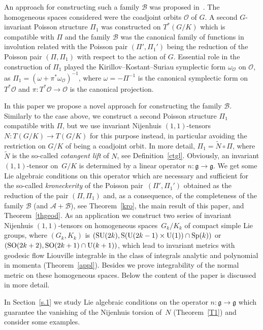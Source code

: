 \documentclass[pdftex]{sigma}
\numberwithin{equation}{section}
\begin{document}
An approach for constructing such a family $\mathcal{B}$ was proposed in~\cite{p4}. The homogeneous spaces considered were the coadjoint orbits $\mathcal{O}$ of $G$. A second $G$-invariant Poisson structure $\Pi_1$ was constructed on $T^*(G/K)$ which is compatible with $\Pi$ and the family $\mathcal{B}$ was the canonical family of functions in involution related with the Poisson pair $(\Pi',\Pi_1')$ being the reduction of the Poisson pair $(\Pi,\Pi_1)$ with respect to the action of $G$. Essential role in the construction of $\Pi_1$ played the Kirillov--Kostant--Suriau symplectic form $\omega_\mathcal{O}$ on $\mathcal{O}$, as $\Pi_1=(\omega+\pi^*\omega_\mathcal{O})^{-1}$, where $\omega=-\Pi^{-1}$ is the canonical symplectic form on $T^*\mathcal{O}$ and $\pi\colon T^*\mathcal{O}\to \mathcal{O}$ is the canonical projection.

In this paper we propose a novel approach for constructing the family $\mathcal{B}$. Similarly to the case above, we construct a second Poisson structure $\Pi_1$ compatible with $\Pi$, but we use invariant Nijenhuis $(1,1)$-tensors $N\colon T(G/K)\to T(G/K)$ for this purpose instead, in particular avoiding the restriction on $G/K$ of being a coadjoint orbit. In more detail, $\Pi_1=\widetilde{N}\circ\Pi$, where $\widetilde{N}$ is the so-called \emph{cotangent lift} of $N$, see Definition~\ref{ctgl}. Obviously, an invariant $(1,1)$-tensor on~$G/K$ is determined by a linear operator $n\colon \mathfrak{g}\to\mathfrak{g}$. We get some Lie algebraic conditions on this operator which are necessary and sufficient for the so-called \emph{kroneckerity} of the Poisson pair~$(\Pi',\Pi_1')$ obtained as the reduction of the pair $(\Pi,\Pi_1)$ and, as a consequence, of the completeness of the family $\mathcal{B}$ (and $\mathcal{A}+\mathcal {B}$), see Theorem~\ref{kro}, the main result of this paper, and Theorem~\ref{thgeod}. As an application we construct two series of invariant Nijenhuis $(1,1)$-tensors on homogeneous spaces~$G_k/K_k$ of compact simple Lie groups, where $(G_k,K_k)$ is $({\rm SU}(2k),{\rm S}({\rm U}(2k-1)\times {\rm U}(1))\cap {\rm Sp}(k))$ or $({\rm SO}(2k+2),{\rm SO}(2k+1)\cap {\rm U}(k+1))$, which lead to invariant metrics with geodesic flow Liouville integrable in the class of integrals analytic and polynomial in momenta (Theorem~\ref{appl}). Besides we prove integrability of the normal metric on these homogeneous spaces. Below the content of the paper is discussed in more detail.

In Section~\ref{s.1} we study Lie algebraic conditions on the operator $n\colon \mathfrak{g}\to\mathfrak{g}$ which guarantee the vanishing of the Nijenhuis torsion of~$N$ (Theorem~\ref{T1}) and consider some examples.
\end{document}
